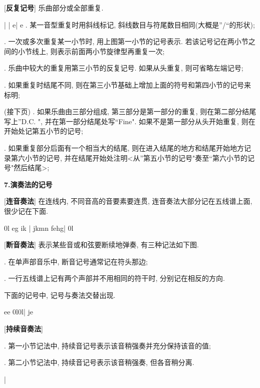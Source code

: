 [\textbf{反复记号}] 乐曲部分或全部重复.\par
\startextract 
\Notes \duevolte \en\bar
\Notes \en{}\leftrepeat
\Notes \en\setendvoltabox{}\rightrepeat
\Notes \en\setendvolta\bar
\Notes \segno e\en\bar
\Notes \coda e\en
\zendextract 
{}. 某一音型重复时用斜线标记, 斜线数目与符尾数目相同(大概是''/``的形状);\par
{}. 一次或多次重复某一小节时, 用上图第一小节的记号表示. 若该记号记在两小节之间的小节线上, 则表示前面两小节旋律型再重复一次;\par
{}. 乐曲中较大的重复用第三小节的反复记号. 如果从头重复, 则可省略左端记号;\par
{}. 如果重复时结尾不同, 则在第三小节基础上增加上面的符号和第四小节的记号来标明;\par
\qquad (接下页)
\clearpage
{}. 如果乐曲由三部分组成, 第三部分是第一部分的重复, 则在第二部分结尾写上''D.C.
", 并在第一部分结尾处写``Fine". 如果不是第一部分从头开始重复, 则在开始处记第五小节的记号;\par
{}. 如果重复部分后面有一个相当大的结尾, 则在进入结尾的地方和结尾开始地方记录第六小节的记号, 并在结尾开始处注明<从''第五小节的记号"奏至``第六小节的记号"然后结尾>;\par 

\begin{center}
 \textbf{7.演奏法的记号}\\
\end{center}

[\textbf{连音奏法}] 在连线内, 不同音高的音要素要连贯, 连音奏法大部分记在五线谱上面, 很少记在下面.\par
\startextract 
\Notes \isluru0l  \Dqbu eg \Dqbl ik \en\bar
\Notes \Qqbu jkmn \Qqbl fehg\en\bar
\Notes \tslur0l\en
\zendextract

[\textbf{断音奏法}] 表示某些音或和弦要断续地弹奏, 有三种记法如下图.\par
{}. 在单声部音乐中, 断音记号通常记在符头那边;\par
{}. 一行五线谱上记有两个声部并不用相同的符干时, 分别记在相反的方向.\par
\qquad 下面的记号中, 记号与奏法交替出现.\par
\startextract
\Notes {} \lpz e\qu e  \isluru0l\tslur0l\en\bar
\Notes \cl j\ds \cu e\ds {}\dsp {}\qs {}\qs\en
\zendextract

[\textbf{持续音奏法}] \par
{}. 第一小节记法中, 持续音记号表示该音稍强奏并充分保持该音的值;\par
{}. 第二小节记法中, 持续音记号表示该音稍强奏, 但各音稍分离.\par
\startextract
\Notes {} \en\bar
\Notes {} \en
\zendextract


